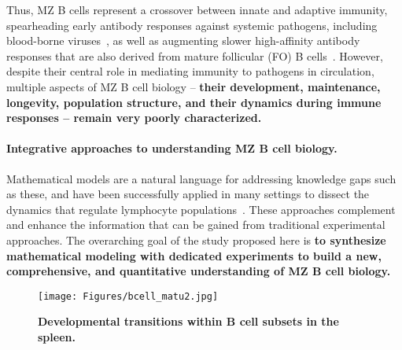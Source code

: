 \documentclass[11pt]{article}
\newcommand{\para}[1]{\vspace*{-4.5mm}\paragraph{#1}}
\newcommand{\red}[1]{{\color{red}{#1}}}
\begin{document}
Thus, MZ B cells represent a crossover between innate and adaptive immunity, spearheading early antibody responses against  systemic pathogens, including blood-borne viruses~\cite{Szomolanyi_Tsuda_1998, Gatto_2004}, as well as augmenting slower high-affinity antibody responses that are also derived from mature follicular (FO) B cells~\cite{Oliver_1999, Attanavanich_2004, Pone_2012}.
However, despite their central role in mediating immunity to pathogens in circulation, multiple aspects of MZ B cell biology -- \textbf{{their development, maintenance, longevity, population structure, and their dynamics during immune responses -- remain very poorly characterized.}}

\para{Integrative approaches to understanding MZ B cell biology.}
Mathematical models are a natural language for addressing knowledge gaps such as these, and have been successfully applied in many settings to dissect the dynamics that regulate lymphocyte populations~\cite{Thomas_Vaslin_1989, Rolink_1999, Asquith_2002, Antia_2005, Anderson_2009, Dowling_2009, Johnson_2012, Meyer-Hermann_2012, De_Boer_2013,  Westera_2013,   Gossel_2017, Hogan_2015, van_Hoeven_2017, Reynaldi_2019, Rane_2018, Mold_2019, Verheijen_2020, Rane_2022}.
These approaches complement and enhance the information that can be gained from traditional experimental approaches.
The overarching goal of the study proposed here is  \textbf{{to synthesize mathematical modeling with dedicated experiments to build a new,  comprehensive, and quantitative understanding of MZ B cell biology.}}

\begin{wrapfigure}{r}{0.3\textwidth}
\centering
\vspace*{-5mm}
\texttt{[image: Figures/bcell\_matu2.jpg]}
\vspace*{-8mm}
\caption{\textbf{Developmental transitions within B cell subsets in the spleen.}} %
\label{fig:MZ_dev}
\vspace*{-5mm}
\end{wrapfigure}
\end{document}
